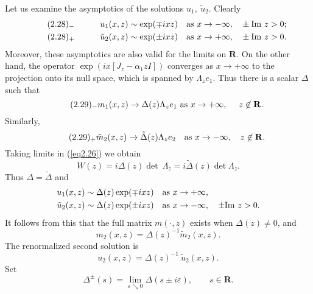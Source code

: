 \documentclass{surv-l}
\theoremstyle{plain}
\theoremstyle{definition}
\numberwithin{equation}{chapter}
\begin{document}
Let us examine the asymptotics of the solutions $u_{1},\ \tilde{u}_{2}$. Clearly
\begin{align*}\label{eq2.28-}
\tag*{$(2.28)_{-}$} \qquad \quad &u_{1}(x,z)\sim\exp(\mp ixz)&\mathrm{as}\ x\rightarrow-\infty,
&\quad\pm\mathrm{Im}\ z>0;\\\label{eq2.28+}
\tag*{$(2.28)_{+}$}  \qquad \quad &\tilde{u}_{2}(x,z)\sim\exp(\pm ixz)&\mathrm{as}\ x\rightarrow+\infty,&\quad\pm\mathrm{ Im}\ z>0.
\end{align*}
Moreover, these asymptotics are also valid for the limits on $\mathbf{R}$. On the other hand, the operator $\exp(ix[J_{z}-\alpha_{1}zI])$ converges as $ x\rightarrow+\infty$ to the projection onto its null space, which is spanned by $\Lambda_{z}e_{1}$. Thus there is a scalar $\Delta$ such that
\begin{equation*}\label{eq2.29-}
\tag*{$(2.29)_{-}$}  m_{1}(x,z)\rightarrow\Delta(z)\Lambda_{z}e_{1}\ \mathrm{as}\  x\rightarrow+\infty,\quad \ z\not\in \mathbf{R}.
\end{equation*}
Similarly,
\begin{equation*}\label{eq2.29+}
\tag*{$(2.29)_{+}$}  \tilde{m}_{2}(x, z)\rightarrow\tilde{\Delta}(z)\Lambda_{z}e_{2}\quad  \mathrm{as}\  x\rightarrow-\infty,\quad z\not\in \mathbf{R}.
\end{equation*}
Taking limits in (\ref{eq2.26}) we obtain
\setcounter{equation}{29}
\begin{equation}\label{eq2.30}
 W(z)=i\Delta(z)\det\ \Lambda_{z}=i\tilde{\Delta}(z)\det\Lambda_{z}.
\end{equation}
Thus $\Delta=\tilde{\Delta}$ and
\begin{align}\label{eq2.31}
&u_{1}(x,z)\sim\Delta(z)\exp(\mp ixz)\quad\mathrm{as}\ x\rightarrow+\infty,\\ \notag
&\tilde{u}_{2}(x,z)\sim\Delta(z)\exp(\pm ixz)\quad\mathrm{as}\ x\rightarrow-\infty, \quad\pm\mathrm{Im}\ z>0.
\end{align}
It follows from this that the full matrix $m(\cdot, z)$ exists when $\Delta(z)\neq 0$, and
\begin{equation}\label{eq2.32}
m_{2}(x, z)=\Delta(z)^{-1}\tilde{m}_{2}(x, z).
\end{equation}
The renormalized second solution is
\begin{equation}\label{eq2.33}
u_{2}(x, z)=\Delta(z)^{-1}\ \tilde{u}_{2}(x,z).
\end{equation}
Set
\begin{equation}\label{eq2.34}
\Delta^{\pm}(s)=\mathop\mathrm{lim}_{\varepsilon\searrow 0}\Delta(s\pm i\varepsilon),\qquad s\in \mathbf{R}.
\end{equation}
\end{document}
